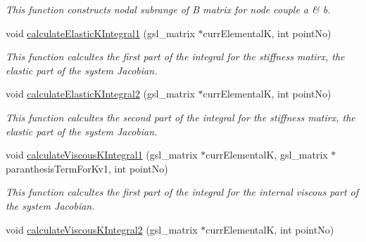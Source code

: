 \begin{DoxyCompactItemize}
\begin{DoxyCompactList}\small\item\em This function constructs nodal subrange of B matrix for node couple a \& b. \end{DoxyCompactList}\item 
\hypertarget{classShapeBase_abb02278c3894e00fdbc0cd2e379111ce}{}void \hyperlink{classShapeBase_abb02278c3894e00fdbc0cd2e379111ce}{calculate\+Elastic\+K\+Integral1} (gsl\+\_\+matrix $\ast$curr\+Elemental\+K, int point\+No)\label{classShapeBase_abb02278c3894e00fdbc0cd2e379111ce}

\begin{DoxyCompactList}\small\item\em This function calcultes the first part of the integral for the stiffness matirx, the elastic part of the system Jacobian. \end{DoxyCompactList}\item 
\hypertarget{classShapeBase_a74a5f7382e5d4038e4396d3f4a198105}{}void \hyperlink{classShapeBase_a74a5f7382e5d4038e4396d3f4a198105}{calculate\+Elastic\+K\+Integral2} (gsl\+\_\+matrix $\ast$curr\+Elemental\+K, int point\+No)\label{classShapeBase_a74a5f7382e5d4038e4396d3f4a198105}

\begin{DoxyCompactList}\small\item\em This function calcultes the second part of the integral for the stiffness matirx, the elastic part of the system Jacobian. \end{DoxyCompactList}\item 
\hypertarget{classShapeBase_a5cdcb5b445291f28d3ed3d83c582f534}{}void \hyperlink{classShapeBase_a5cdcb5b445291f28d3ed3d83c582f534}{calculate\+Viscous\+K\+Integral1} (gsl\+\_\+matrix $\ast$curr\+Elemental\+K, gsl\+\_\+matrix $\ast$paranthesis\+Term\+For\+Kv1, int point\+No)\label{classShapeBase_a5cdcb5b445291f28d3ed3d83c582f534}

\begin{DoxyCompactList}\small\item\em This function calcultes the first part of the integral for the internal viscous part of the system Jacobian. \end{DoxyCompactList}\item 
\hypertarget{classShapeBase_a9795e5aad1361070df5ecdd735d9361b}{}void \hyperlink{classShapeBase_a9795e5aad1361070df5ecdd735d9361b}{calculate\+Viscous\+K\+Integral2} (gsl\+\_\+matrix $\ast$curr\+Elemental\+K, int point\+No)\label{classShapeBase_a9795e5aad1361070df5ecdd735d9361b}


\end{DoxyCompactItemize}

